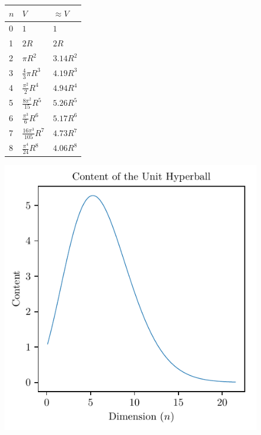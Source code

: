 \documentclass{article}
\begin{document}
\begin{figure}
	\centering
	\begin{minipage}{.5\textwidth}
		\centering
		\begin{tabular}{lll}
			\toprule
			$n$ & $V$ & $\approx V$ \\
			\midrule
			0 	& $1$ 						& $1$ \\
			1	& $2R$ 						& $2R$ \\
			2	& $\pi{}R^2$				& $3.14R^2$ \\
			3 	& $\frac{4}{3}\pi{}R^3$		& $4.19R^3$ \\
			4	& $\frac{\pi^2}{2}R^4$		& $4.94R^4$ \\
			5	& $\frac{8\pi^2}{15}R^5$	& $5.26R^5$ \\
			6 	& $\frac{\pi^3}{6}R^6$		& $5.17R^6$ \\
			7 	& $\frac{16\pi^3}{105}R^7$ 	& $4.73R^7$ \\
			8	& $\frac{\pi^4}{24}R^8$		&$4.06R^8$ \\
			\bottomrule
		\end{tabular}
		\end{minipage}%
		\begin{minipage}{.5\textwidth}
			\centering
			\includegraphics[width=\linewidth]{n-ball-graph-right.pdf}
		\end{minipage}
	\end{figure}
\end{document}
